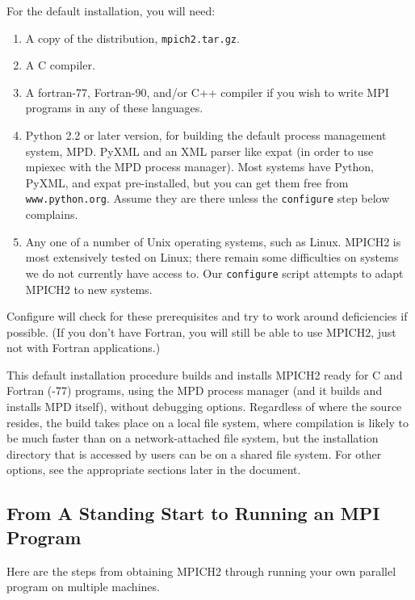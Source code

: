 \documentclass[dvipdfm,11pt]{article}
\begin{document}
For the default installation, you will need:
\begin{enumerate}
\item A copy of the distribution, \texttt{mpich2.tar.gz}.
\item A C compiler.
\item A fortran-77, Fortran-90, and/or C++ compiler if you wish to write
  MPI programs in any of these languages.
\item Python 2.2 or later version, for building the default process
  management system, MPD.  PyXML and an XML parser like expat (in order
  to use mpiexec with the MPD process manager).  Most systems have
  Python, PyXML, and expat pre-installed, but you can get them free from
  \texttt{www.python.org}.  Assume they are there unless the
  \texttt{configure} step below complains.
\item Any one of a number of Unix operating systems, such as Linux.
  MPICH2 is most extensively tested on Linux;  there remain some
  difficulties on systems we do not currently have access to.  Our
  \texttt{configure} script attempts to adapt MPICH2 to new systems. 
\end{enumerate}
Configure will check for these prerequisites and try to work around
deficiencies if possible.  (If you don't have Fortran, you will
still be able to use MPICH2, just not with Fortran applications.)

This default installation procedure builds and installs MPICH2 ready for
C and Fortran (-77) programs, using the MPD process manager (and it
builds and installs MPD itself), without debugging options.  Regardless
of where the source resides, the build takes place on a local file
system, where compilation is likely to be much faster than on a
network-attached file system, but the installation directory that is
accessed by users can be on a shared file system.  For other options,
see the appropriate sections later in the document.

\subsection{From A Standing Start to Running an MPI Program}
\label{sec:steps}
Here are the steps from obtaining MPICH2 through running your own
parallel program on multiple machines.
\end{document}
